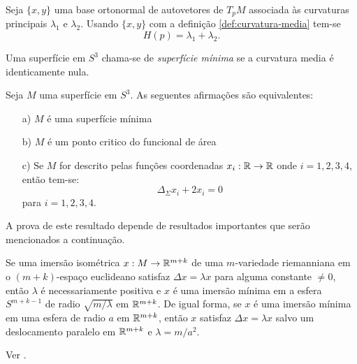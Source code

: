 \begin{demonstracao}
	Seja $\{x,y\}$ uma base ortonormal de autovetores de $T_p M$ associada às curvaturas principais $\lambda_1$ e $\lambda_2$.
	Usando $\{x,y\}$ com a definição \ref{def:curvatura-media} tem-se
	\begin{equation*}
		H(p) = \lambda_1 + \lambda_2.
	\end{equation*}
\end{demonstracao}

\begin{definicao}
	Uma superfície em $S^3$ chama-se de \emph{superfície mínima} se a curvatura media é identicamente nula.
\end{definicao}

\begin{teorema}\label{propriedades_sup_min_S3}
	Seja $M$ uma superfície em $S^3$. As seguentes afirmações são equivalentes:
	\begin{enumerate}
		\item[a)] $M$ é uma superfície mínima
		\item[b)] $M$ é um ponto critico do funcional de área
		\item[c)] Se $M$ for descrito pelas funções coordenadas $x_i: \mathbb{R} \rightarrow \mathbb{R}$ onde $i=1,2,3,4$, então tem-se:
		\begin{equation*}
		\Delta_{\Sigma} x_i + 2 x_i = 0
		\end{equation*}
		para $i=1,2,3,4$.
	\end{enumerate}
\end{teorema}
A prova de este resultado depende de resultados importantes que serão mencionados a continuação.
\begin{teorema}\label{thm:takahashi}
	Se uma imersão isométrica $x: M \rightarrow \mathbb R^{m+k}$ de uma $m$-variedade riemanniana em o $(m+k)$-espaço euclideano satisfaz $ \Delta x = \lambda x $ para alguma constante $\neq 0$, então $\lambda$ é necessariamente positiva e $x$ é uma imersão mínima em a esfera $S^{m+k-1}$ de radio $\sqrt{m/\lambda}$ em $\mathbb R^{m+k}$. De igual forma, se $x$ é uma imersão mínima em uma esfera de radio $a$ em $\mathbb R^{m+k}$, então $x$ satisfaz $\Delta x = \lambda x$ salvo um deslocamento paralelo em $\mathbb R^{m+k}$ e $\lambda = m/a^2$.
\end{teorema}

\begin{demonstracao}
	Ver \cite[Theorem 3]{TAKAHASHI1966}.
\end{demonstracao}

